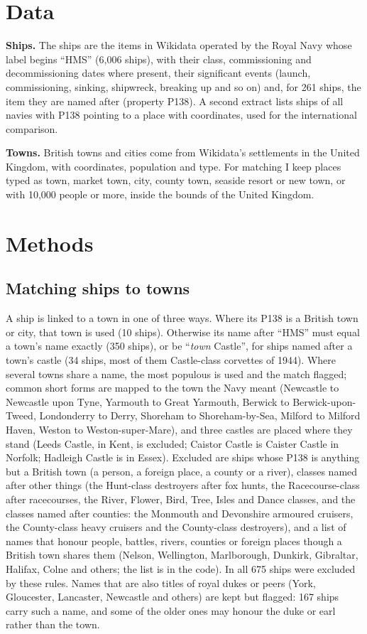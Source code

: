 \documentclass[11pt,a4paper]{article}
\begin{document}
\section{Data}
\textbf{Ships.} The ships are the items in Wikidata \citep{wikidata} operated by the Royal Navy whose label begins ``HMS'' (6,006 ships), with their class, commissioning and decommissioning dates where present, their significant events (launch, commissioning, sinking, shipwreck, breaking up and so on) and, for 261 ships, the item they are named after (property P138). A second extract lists ships of all navies with P138 pointing to a place with coordinates, used for the international comparison.

\textbf{Towns.} British towns and cities come from Wikidata's settlements in the United Kingdom, with coordinates, population and type. For matching I keep places typed as town, market town, city, county town, seaside resort or new town, or with 10,000 people or more, inside the bounds of the United Kingdom.

\section{Methods}
\subsection{Matching ships to towns}
A ship is linked to a town in one of three ways. Where its P138 is a British town or city, that town is used (10 ships). Otherwise its name after ``HMS'' must equal a town's name exactly (350 ships), or be ``\textit{town} Castle'', for ships named after a town's castle (34 ships, most of them Castle-class corvettes of 1944). Where several towns share a name, the most populous is used and the match flagged; common short forms are mapped to the town the Navy meant (Newcastle to Newcastle upon Tyne, Yarmouth to Great Yarmouth, Berwick to Berwick-upon-Tweed, Londonderry to Derry, Shoreham to Shoreham-by-Sea, Milford to Milford Haven, Weston to Weston-super-Mare), and three castles are placed where they stand (Leeds Castle, in Kent, is excluded; Caistor Castle is Caister Castle in Norfolk; Hadleigh Castle is in Essex). Excluded are ships whose P138 is anything but a British town (a person, a foreign place, a county or a river), classes named after other things (the Hunt-class destroyers after fox hunts, the Racecourse-class after racecourses, the River, Flower, Bird, Tree, Isles and Dance classes, and the classes named after counties: the Monmouth and Devonshire armoured cruisers, the County-class heavy cruisers and the County-class destroyers), and a list of names that honour people, battles, rivers, counties or foreign places though a British town shares them (Nelson, Wellington, Marlborough, Dunkirk, Gibraltar, Halifax, Colne and others; the list is in the code). In all 675 ships were excluded by these rules. Names that are also titles of royal dukes or peers (York, Gloucester, Lancaster, Newcastle and others) are kept but flagged: 167 ships carry such a name, and some of the older ones may honour the duke or earl rather than the town.
\end{document}

